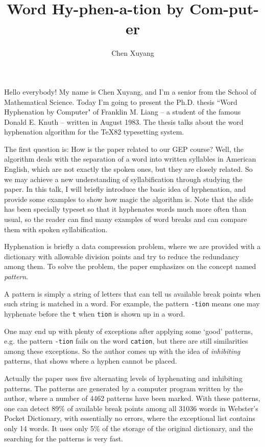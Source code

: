 \documentclass[11pt]{article}
\title{Word Hy-phen-a-tion by Com-put-er}
\author{Chen Xuyang}
\newcommand{\pat}[1]{\texttt{#1}}
\begin{document}
  \maketitle\thispagestyle{empty}\clearpage

  Hello everybody! My name is Chen Xuyang, and I'm a senior from the School of Mathematical Science. Today I'm going to present the Ph.D. thesis ``Word Hyphenation by Computer" of Franklin M. Liang -- a student of the famous Donald E. Knuth -- written in August 1983. The thesis talks about the word hyphenation algorithm for the \TeX 82 typesetting system.

  The first question is: How is the paper related to our GEP course? Well, the algorithm deals with the separation of a word into written syllables in American English, which are not exactly the spoken ones, but they are closely related. So we may achieve a new understanding of syllabification through studying the paper. In this talk, I will briefly introduce the basic idea of hyphenation, and provide some examples to show how magic the algorithm is. Note that the slide has been specially typeset so that it hyphenates words much more often than usual, so the reader can find many examples of word breaks and can compare them with spoken syllabification.

  Hyphenation is briefly a data compression problem, where we are provided with a dictionary with allowable division points and try to reduce the redundancy among them. To solve the problem, the paper emphasizes on the concept named \emph{pattern}.

  A pattern is simply a string of letters that can tell us available break points when such string is matched in a word. For example, the pattern \pat{-tion} means one may hyphenate before the \pat{t} when \pat{tion} is shown up in a word.

  One may end up with plenty of exceptions after applying some `good' patterns, e.g. the pattern \pat{-tion} fails on the word \pat{cation}, but there are still similarities among these exceptions. So the author comes up with the idea of \emph{inhibiting} patterns, that shows where a hyphen cannot be placed.

  Actually the paper uses five alternating levels of hyphenating and inhibiting patterns. The patterns are generated by a computer program written by the author, where a number of 4462 patterns have been marked. With these patterns, one can detect 89\% of available break points among all 31036 words in Webster's Pocket Dictionary, with essentially no errors, where the exceptional list contains only 14 words. It uses only 5\% of the storage of the original dictionary, and the searching for the patterns is very fast.
\end{document}

